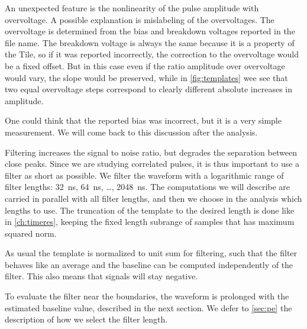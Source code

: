 
\begin{figure}
    
    
    
\end{figure}

An unexpected feature is the nonlinearity of the pulse amplitude with
overvoltage. A possible explanation is mislabeling of the overvoltages. The
overvoltage is determined from the bias and breakdown voltages reported in the
file name. The breakdown voltage is always the same because it is a property of
the Tile, so if it was reported incorrectly, the correction to the overvoltage
would be a fixed offset. But in this case even if the ratio amplitude over
overvoltage would vary, the slope would be preserved, while in
\autoref{fig:templates} wee see that two equal overvoltage steps correspond to
clearly different absolute increases in amplitude.

One could think that the reported bias was incorrect, but it is a very simple
measurement. We will come back to this discussion after the analysis.

Filtering increases the signal to noise ratio, but degrades the separation
between close peaks. Since we are studying correlated pulses, it is thus
important to use a filter as short as possible. We filter the waveform with a
logarithmic range of filter lengths: \SI{32}{ns}, \SI{64}{ns}, \ldots,
\SI{2048}{ns}. The computations we will describe are carried in parallel with
all filter lengths, and then we choose in the analysis which lengths to use.
The truncation of the template to the desired length is done like in
\autoref{ch:timeres}, keeping the fixed length subrange of samples that has
maximum squared norm.


As usual the template is normalized to unit sum for filtering, such that the
filter behaves like an average and the baseline can be computed independently
of the filter. This also means that signals will stay negative.

To evaluate the filter near the boundaries, the waveform is prolonged with the
estimated baseline value, described in the next section. We defer to
\autoref{sec:pe} the description of how we select the filter length.


